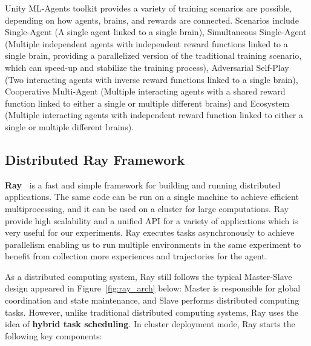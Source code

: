 Unity ML-Agents toolkit provides a variety of training scenarios are possible, depending on how agents, brains, and rewards are connected. Scenarios include Single-Agent (A single agent linked to a single brain), Simultaneous Single-Agent (Multiple independent agents with independent reward functions linked to a single brain, providing a parallelized version of the traditional training scenario, which can speed-up and stabilize the training process), Adversarial Self-Play (Two interacting agents with inverse reward functions linked to a single brain), Cooperative Multi-Agent (Multiple interacting agents with a shared reward function linked to either a single or multiple different brains) and Ecosystem (Multiple interacting agents with independent reward function linked to either a single or multiple different brains).

\subsection{Distributed Ray Framework}

\textbf{Ray~\parencite{moritz2018ray}} is a fast and simple framework for building and running distributed applications. The same code can be run on a single machine to achieve efficient multiprocessing, and it can be used on a cluster for large computations. Ray provide high scalability and a unified API for a variety of applications which is very useful for our experiments. Ray executes tasks asynchronously to achieve parallelism enabling us to run multiple environments in the same experiment to benefit from collection more experiences and trajectories for the agent.

As a distributed computing system, Ray still follows the typical Master-Slave design appeared in Figure~\ref{fig:ray_arch} below: Master is responsible for global coordination and state maintenance, and Slave performs distributed computing tasks. However, unlike traditional distributed computing systems, Ray uses the idea of \textbf{hybrid task scheduling}. In cluster deployment mode, Ray starts the following key components:

